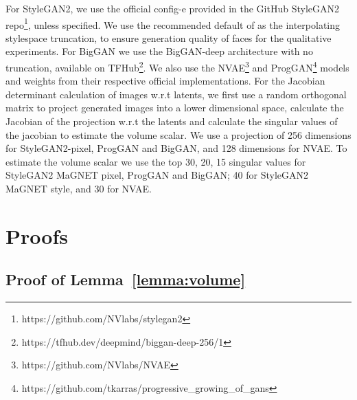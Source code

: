 For StyleGAN2, we use the official config-e provided in the GitHub StyleGAN2 repo\footnote{https://github.com/NVlabs/stylegan2}, unless specified. We use the recommended default of  as the interpolating stylespace truncation, to ensure generation quality of faces for the qualitative experiments. For BigGAN we use the BigGAN-deep architecture with no truncation, available on TFHub\footnote{https://tfhub.dev/deepmind/biggan-deep-256/1}. We also use the NVAE\footnote{https://github.com/NVlabs/NVAE} and ProgGAN\footnote{https://github.com/tkarras/progressive\_growing\_of\_gans} models and weights from their respective official implementations. For the Jacobian determinant calculation of images w.r.t latents, we first use a random orthogonal matrix to project generated images into a lower dimensional space, calculate the Jacobian of the projection w.r.t the latents and calculate the singular values of the jacobian to estimate the volume scalar. We use a projection of 256 dimensions for StyleGAN2-pixel, ProgGAN and BigGAN, and 128 dimensions for NVAE. To estimate the volume scalar we use the top 30, 20, 15 singular values for StyleGAN2 MaGNET pixel, ProgGAN and BigGAN; 40 for StyleGAN2 MaGNET style, and 30 for NVAE. 


\section{Proofs}
\label{appendix:proofs}















































\subsection{Proof of Lemma~\ref{lemma:volume}}
\label{proof:volume}

